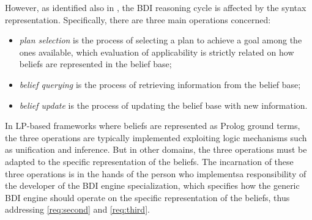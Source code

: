 \documentclass[
]{ceurart}
\begin{document}
However,
as identified also in \cite{DBLP:conf/dalt/MoreiraVBH05}, 
the \ac{BDI} reasoning cycle is affected by the syntax representation.
%
Specifically,
there are three main operations concerned:
\begin{itemize} 
  \item \emph{plan selection} is the process of selecting a plan to achieve a goal among the ones available, 
  which evaluation of applicability is strictly related on how beliefs are represented in the belief base;
  \item \emph{belief querying} is the process of retrieving information from the belief base;
  \item \emph{belief update} is the process of updating the belief base with new information.
\end{itemize}
%
In \ac{LP}-based frameworks where beliefs are represented as Prolog ground terms, 
the three operations are typically implemented exploiting logic mechanisms such as unification and inference.
%
But in other domains,
the three operations must be adapted to the specific representation of the beliefs.
%
The incarnation of these three operations is in the hands of the person who implementsa responsibility of the developer of the \ac{BDI} engine specialization,
which specifies how the generic \ac{BDI} engine should operate on the specific representation of the beliefs,
thus addressing \ref{req:second} and \ref{req:third}. 
\end{document}
